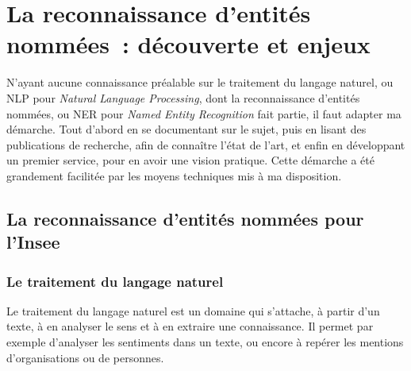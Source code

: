 \section{La reconnaissance d'entités nommées~: découverte et enjeux}
N'ayant aucune connaissance préalable sur le traitement du langage naturel, ou NLP pour \textit{Natural Language Processing}, dont la reconnaissance d'entités nommées, ou NER pour \textit{Named Entity Recognition} fait partie, il faut adapter ma démarche. Tout d'abord en se documentant sur le sujet, puis en lisant des publications de recherche, afin de connaître l'état de l'art, et enfin en développant un premier service, pour en avoir une vision pratique. Cette démarche a été grandement facilitée par les moyens techniques mis à ma disposition.
\newline

\subsection{La reconnaissance d'entités nommées pour l'Insee}

\subsubsection{Le traitement du langage naturel}
Le traitement du langage naturel est un domaine qui s'attache, à partir d'un texte, à en analyser le sens et à en extraire une connaissance. Il permet par exemple d'analyser les sentiments dans un texte, ou encore à repérer les mentions d'organisations ou de personnes.
\newline

